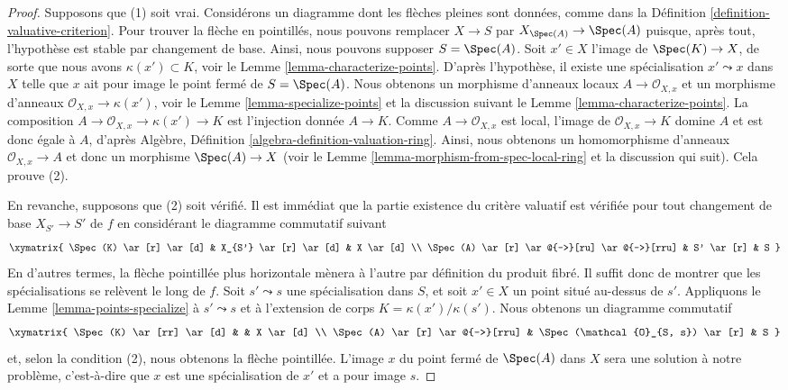 \begin{proof}
Supposons que (1) soit vrai. Considérons un diagramme dont les flèches pleines sont données, comme dans la Définition
 \ref{definition-valuative-criterion}. Pour trouver la flèche en pointillés, nous pouvons remplacer
 $X \to S$  par  $X_{\Spec(A)} \to \Spec(A)$  puisque, après tout, l’hypothèse est stable par
changement de base. Ainsi, nous pouvons supposer  $S = \Spec(A)$. Soit  $x' \in X$ 
l’image de  $\Spec(K) \to X$, de sorte que nous avons  $\kappa(x') \subset K$, voir le Lemme
 \ref{lemma-characterize-points}. D’après l’hypothèse, il existe une spécialisation  $x' \leadsto x$  dans
 $X$  telle que  $x$  ait pour image le point fermé de
 $S = \Spec(A)$. Nous obtenons un morphisme d’anneaux locaux  $A \to \mathcal{O}_{X, x}$  et un
morphisme d’anneaux  $\mathcal{O}_{X, x} \to \kappa(x')$, voir le Lemme  \ref{lemma-specialize-points}  et la discussion
suivant le Lemme  \ref{lemma-characterize-points}. La composition  $A \to \mathcal{O}_{X, x} \to \kappa(x') \to K$  est l'injection donnée
 $A \to K$. Comme  $A \to \mathcal{O}_{X, x}$  est local, l'image de  $\mathcal{O}_{X, x} \to K$  domine
 $A$  et est donc égale à  $A$, d'après Algèbre, Définition
 \ref{algebra-definition-valuation-ring}. Ainsi, nous obtenons un homomorphisme d'anneaux  $\mathcal{O}_{X, x} \to A$  et donc
un morphisme  $\Spec(A) \to X$  (voir le Lemme  \ref{lemma-morphism-from-spec-local-ring}  et la discussion qui suit).
Cela prouve (2).

\medskip\noindent
En revanche, supposons que (2) soit vérifié. Il est immédiat que la partie
existence du critère valuatif est vérifiée pour tout changement de base
 $X_{S'} \to S'$  de  $f$  en considérant le diagramme commutatif suivant
$$
\xymatrix{
\Spec(K) \ar[r] \ar[d] & X_{S'} \ar[r] \ar[d] & X \ar[d] \\
\Spec(A) \ar[r] \ar@{-->}[ru] \ar@{-->}[rru] & S' \ar[r] & S
}
$$
En d'autres termes, la flèche pointillée plus horizontale mènera à l'autre par
définition du produit fibré. Il suffit donc de montrer que
les spécialisations se relèvent le long de  $f$. Soit  $s' \leadsto s$  une
spécialisation dans  $S$, et soit  $x' \in X$  un point situé au-dessus de
 $s'$. Appliquons le Lemme  \ref{lemma-points-specialize}  à  $s' \leadsto s$  et à l'extension de
corps  $K = \kappa(x')/\kappa(s')$. Nous obtenons un diagramme commutatif
$$
\xymatrix{
\Spec(K) \ar[rr] \ar[d] & & X \ar[d] \\
\Spec(A) \ar[r] \ar@{-->}[rru] &
\Spec(\mathcal{O}_{S, s}) \ar[r] & S
}
$$
et, selon la condition (2), nous obtenons la flèche pointillée. L'image
 $x$  du point fermé de  $\Spec(A)$  dans  $X$  sera une solution à
notre problème, c'est-à-dire que  $x$  est une spécialisation de
 $x'$  et a pour image  $s$.
\end{proof}

